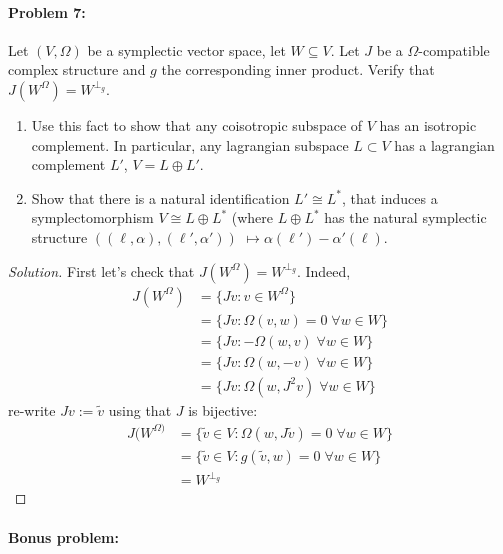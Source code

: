 \paragraph{Problem 7:} Let $(V,\Omega)$ be a symplectic vector space, let $W\subseteq V$. Let $J$ be a $\Omega$-compatible complex structure and $g$ the corresponding inner product. Verify that $J(W^{\Omega} )=W^{\perp_{g}}$.
\begin{enumerate}[label=\alph*.]
	\item Use this fact to show that any coisotropic subspace of $V$ has an isotropic complement. In particular, any lagrangian subspace $L\subset V$ has a lagrangian complement $L'$, $V=L\oplus L'$.
	
	\item Show that there is a natural identification $L'\cong L^{*}$, that induces a symplectomorphism $V\cong L\oplus L^{*}$ (where $L\oplus L^{*}$ has the natural symplectic structure $\left( (\ell,\alpha),(\ell',\alpha') \right)$ $\mapsto\alpha(\ell')-\alpha'(\ell)$.
\end{enumerate}

\begin{proof}[Solution]\leavevmode
	First let's check that $J(W^{\Omega} )=W^{\perp_{g}}$. Indeed,
	\begin{align*}
		J(W^{\Omega} )&= \{Jv:v\in W^{\Omega}\}\\
&=\{Jv:\Omega(v,w)=0\;\forall w\in W\} \\
&=\{Jv:-\Omega(w,v)\;\forall w\in W\} \\
& =\{Jv:\Omega(w,-v)\;\forall w\in W\} \\
&=\{Jv:\Omega(w,J^{2}v)\;\forall w\in W\}
	\end{align*}
re-write $Jv:=\tilde{v}$ using that $J$ is bijective:
	\begin{align*}
J(W^{\Omega)}&=\{\tilde{v}\in V:\Omega(w,J\tilde{v})=0\;\forall w\in W\} \\
&=\{ \tilde{v}\in V:g(\tilde{v},w)=0\;\forall w\in W\} \\
& =W^{\perp_{g}}
	\end{align*}


\end{proof}

\paragraph{Bonus problem: } 


